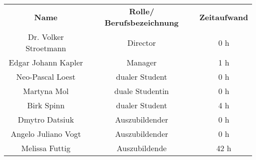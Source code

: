 \begin{tabular}{|c|c|c|}
    \rowcolor{heading}\textbf{Name} & \textbf{Rolle/ Berufsbezeichnung} & \textbf{Zeitaufwand} \\
    Dr. Volker Stroetmann & Director & 0 h \\
    \rowcolor{odd}Edgar Johann Kapler & Manager &  1 h \\
    Neo-Pascal Loest & dualer Student & 0 h \\
    \rowcolor{odd}Martyna Mol & duale Studentin & 0 h \\ 
    Birk Spinn & dualer Student & 4 h \\ 
    \rowcolor{odd}Dmytro Datsiuk & Auszubildender & 0 h \\
    Angelo Juliano Vogt & Auszubildender & 0 h \\
    Melissa Futtig & Auszubildende & 42 h \\
    \hline
\end{tabular}
